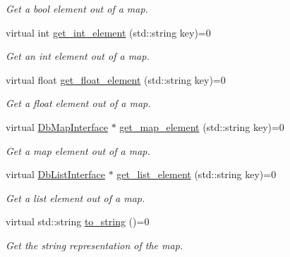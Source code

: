 \begin{DoxyCompactItemize}
\begin{DoxyCompactList}\small\item\em Get a bool element out of a map. \end{DoxyCompactList}\item 
\hypertarget{classDbMapInterface_af64b01be1c5046a7f24ad6ca0679eb2e}{virtual int \hyperlink{classDbMapInterface_af64b01be1c5046a7f24ad6ca0679eb2e}{get\-\_\-int\-\_\-element} (std\-::string key)=0}\label{classDbMapInterface_af64b01be1c5046a7f24ad6ca0679eb2e}

\begin{DoxyCompactList}\small\item\em Get an int element out of a map. \end{DoxyCompactList}\item 
\hypertarget{classDbMapInterface_a7ac207f3a2e80a4817247069465bb6d7}{virtual float \hyperlink{classDbMapInterface_a7ac207f3a2e80a4817247069465bb6d7}{get\-\_\-float\-\_\-element} (std\-::string key)=0}\label{classDbMapInterface_a7ac207f3a2e80a4817247069465bb6d7}

\begin{DoxyCompactList}\small\item\em Get a float element out of a map. \end{DoxyCompactList}\item 
\hypertarget{classDbMapInterface_a4a44768d0cb0aea730ddad18a7be8075}{virtual \hyperlink{classDbMapInterface}{Db\-Map\-Interface} $\ast$ \hyperlink{classDbMapInterface_a4a44768d0cb0aea730ddad18a7be8075}{get\-\_\-map\-\_\-element} (std\-::string key)=0}\label{classDbMapInterface_a4a44768d0cb0aea730ddad18a7be8075}

\begin{DoxyCompactList}\small\item\em Get a map element out of a map. \end{DoxyCompactList}\item 
\hypertarget{classDbMapInterface_aa6cdf8e968d4f5c46e9f24abff10133d}{virtual \hyperlink{classDbListInterface}{Db\-List\-Interface} $\ast$ \hyperlink{classDbMapInterface_aa6cdf8e968d4f5c46e9f24abff10133d}{get\-\_\-list\-\_\-element} (std\-::string key)=0}\label{classDbMapInterface_aa6cdf8e968d4f5c46e9f24abff10133d}

\begin{DoxyCompactList}\small\item\em Get a list element out of a map. \end{DoxyCompactList}\item 
\hypertarget{classDbMapInterface_ad42e26caf01cf8bae0f98db95e32202c}{virtual std\-::string \hyperlink{classDbMapInterface_ad42e26caf01cf8bae0f98db95e32202c}{to\-\_\-string} ()=0}\label{classDbMapInterface_ad42e26caf01cf8bae0f98db95e32202c}

\begin{DoxyCompactList}\small\item\em Get the string representation of the map. \end{DoxyCompactList}\end{DoxyCompactItemize}


